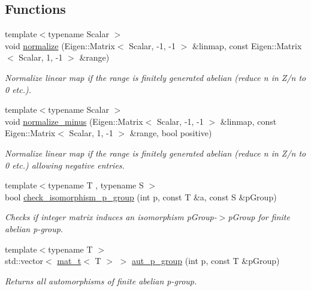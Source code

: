 \subsection*{Functions}
\begin{DoxyCompactItemize}
\item 
{\footnotesize template$<$typename Scalar $>$ }\\void \hyperlink{namespaceMackey_a40d5c8d3e43cd2ee3df09664bc8c56ea}{normalize} (Eigen\+::\+Matrix$<$ Scalar, -\/1, -\/1 $>$ \&linmap, const Eigen\+::\+Matrix$<$ Scalar, 1, -\/1 $>$ \&range)
\begin{DoxyCompactList}\small\item\em Normalize linear map if the range is finitely generated abelian (reduce n in Z/n to 0 etc.). \end{DoxyCompactList}\item 
{\footnotesize template$<$typename Scalar $>$ }\\void \hyperlink{namespaceMackey_a463bb762b4edc2f283e8d1c0c466aedf}{normalize\+\_\+minus} (Eigen\+::\+Matrix$<$ Scalar, -\/1, -\/1 $>$ \&linmap, const Eigen\+::\+Matrix$<$ Scalar, 1, -\/1 $>$ \&range, bool positive)
\begin{DoxyCompactList}\small\item\em Normalize linear map if the range is finitely generated abelian (reduce n in Z/n to 0 etc.) allowing negative entries. \end{DoxyCompactList}\item 
{\footnotesize template$<$typename T , typename S $>$ }\\bool \hyperlink{namespaceMackey_aa96cf972d89b207ce6709e867f760f37}{check\+\_\+isomorphism\+\_\+p\+\_\+group} (int p, const T \&a, const S \&p\+Group)
\begin{DoxyCompactList}\small\item\em Checks if integer matrix induces an isomorphism p\+Group-\/$>$p\+Group for finite abelian p-\/group. \end{DoxyCompactList}\item 
{\footnotesize template$<$typename T $>$ }\\std\+::vector$<$ \hyperlink{namespaceMackey_a035386035757dade630f685e508e5cf9}{mat\+\_\+t}$<$ T $>$ $>$ \hyperlink{namespaceMackey_a918f02198f6daadfd0c93109b63b2f1f}{aut\+\_\+p\+\_\+group} (int p, const T \&p\+Group)
\begin{DoxyCompactList}\small\item\em Returns all automorphisms of finite abelian p-\/group. \end{DoxyCompactList}\item 

\end{DoxyCompactItemize}
